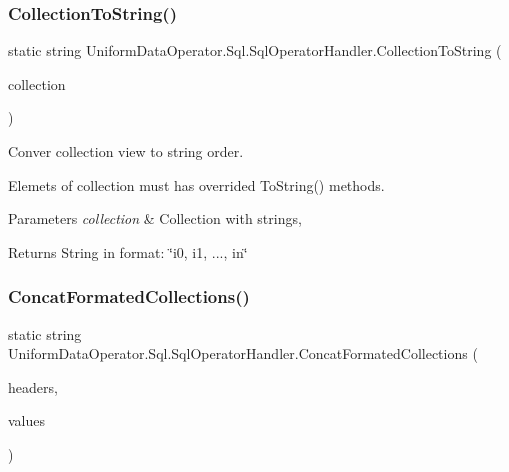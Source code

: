 \subsubsection{\texorpdfstring{Collection\+To\+String()}{CollectionToString()}}
{\footnotesize\ttfamily static string Uniform\+Data\+Operator.\+Sql.\+Sql\+Operator\+Handler.\+Collection\+To\+String (\begin{DoxyParamCaption}\item[{I\+Enumerable$<$ object $>$}]{collection }\end{DoxyParamCaption})\hspace{0.3cm}{\ttfamily [static]}}



Conver collection view to string order. 

Elemets of collection must has overrided To\+String() methods. 


\begin{DoxyParams}{Parameters}
{\em collection} & Collection with strings,\\
\hline
\end{DoxyParams}
\begin{DoxyReturn}{Returns}
String in format\+: \char`\"{}i0, i1, ..., in\char`\"{}
\end{DoxyReturn}
\mbox{\label{class_uniform_data_operator_1_1_sql_1_1_sql_operator_handler_a6973169901301adaecd52fab70df280e}} 
\subsubsection{\texorpdfstring{Concat\+Formated\+Collections()}{ConcatFormatedCollections()}\hspace{0.1cm}{\footnotesize\ttfamily [1/2]}}
{\footnotesize\ttfamily static string Uniform\+Data\+Operator.\+Sql.\+Sql\+Operator\+Handler.\+Concat\+Formated\+Collections (\begin{DoxyParamCaption}\item[{I\+Enumerable$<$ object $>$}]{headers,  }\item[{I\+Enumerable$<$ object $>$}]{values }\end{DoxyParamCaption})\hspace{0.3cm}{\ttfamily [static]}}



